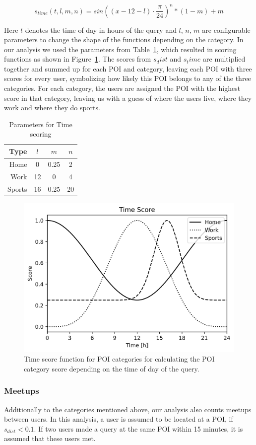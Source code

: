 \documentclass[9pt,conference]{IEEEtran}
\begin{document}
$${s_{time}(t, l, m, n) = sin((x-12-l) \cdot \frac{\pi}{24})^n * (1-m) + m}$$

Here $t$ denotes the time of day in hours of the query and $l$, $n$, $m$ are configurable parameters to change the shape of the functions depending on the category. In our analysis we used the parameters from Table~\ref{tbl:time-score-params}, which resulted in scoring functions as shown in Figure~\ref{fig:time-score}. The scores from $s_dist$ and $s_time$ are multiplied together and summed up for each POI and category, leaving each POI with three scores for every user, symbolizing how likely this POI belongs to any of the three categories. For each category, the users are assigned the POI with the highest score in that category, leaving us with a guess of where the users live, where they work and where they do sports.

\begin{table}
\caption{Parameters for Time scoring}
\centering
\label{tbl:time-score-params}
\begin{tabular}{rccc}
\textbf{Type} & $l$ & $m$ & $n$ \\
\hline
Home & 0 & 0.25 & 2 \\
Work & 12 & 0 & 4 \\   
Sports & 16 & 0.25 & 20    
\end{tabular}
\end{table}

\begin{figure}
    \centering
    \includegraphics[width=0.75\linewidth]{images/time-scores.png}
    \caption{Time score function for POI categories for calculating the POI category score depending on the time of day of the query.}
    \label{fig:time-score}
\end{figure}

\subsubsection{Meetups}
Additionally to the categories mentioned above, our analysis also counts meetups between users. In this analysis, a user is assumed to be located at a POI, if $s_{dist} < 0.1$. If two users made a query at the same POI within 15 minutes, it is assumed that these users met.
\end{document}
